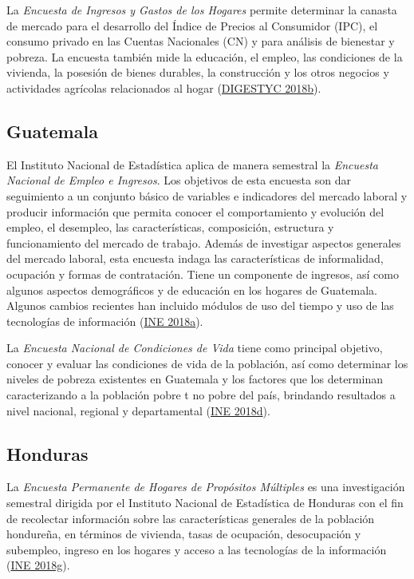 \documentclass[
  12pt,
  spanish,
]{book}
\begin{document}
La \emph{Encuesta de Ingresos y Gastos de los Hogares} permite determinar la canasta de mercado para el desarrollo del Índice de Precios al Consumidor (IPC), el consumo privado en las Cuentas Nacionales (CN) y para análisis de bienestar y pobreza. La encuesta también mide la educación, el empleo, las condiciones de la vivienda, la posesión de bienes durables, la construcción y los otros negocios y actividades agrícolas relacionados al hogar (\protect\hyperlink{ref-DIGESTYC2-SV}{DIGESTYC 2018b}).

\hypertarget{guatemala}{%
\subsection*{Guatemala}\label{guatemala}}

El Instituto Nacional de Estadística aplica de manera semestral la \emph{Encuesta Nacional de Empleo e Ingresos}. Los objetivos de esta encuesta son dar seguimiento a un conjunto básico de variables e indicadores del mercado laboral y producir información que permita conocer el comportamiento y evolución del empleo, el desempleo, las características, composición, estructura y funcionamiento del mercado de trabajo. Además de investigar aspectos generales del mercado laboral, esta encuesta indaga las características de informalidad, ocupación y formas de contratación. Tiene un componente de ingresos, así como algunos aspectos demográficos y de educación en los hogares de Guatemala. Algunos cambios recientes han incluido módulos de uso del tiempo y uso de las tecnologías de información (\protect\hyperlink{ref-INE-GT}{INE 2018a}).

La \emph{Encuesta Nacional de Condiciones de Vida} tiene como principal objetivo, conocer y evaluar las condiciones de vida de la población, así como determinar los niveles de pobreza existentes en Guatemala y los factores que los determinan caracterizando a la población pobre t no pobre del país, brindando resultados a nivel nacional, regional y departamental (\protect\hyperlink{ref-INE2-GT}{INE 2018d}).

\hypertarget{honduras}{%
\subsection*{Honduras}\label{honduras}}

La \emph{Encuesta Permanente de Hogares de Propósitos Múltiples} es una investigación semestral dirigida por el Instituto Nacional de Estadística de Honduras con el fin de recolectar información sobre las características generales de la población hondureña, en términos de vivienda, tasas de ocupación, desocupación y subempleo, ingreso en los hogares y acceso a las tecnologías de la información (\protect\hyperlink{ref-INE-HN}{INE 2018g}).
\end{document}
